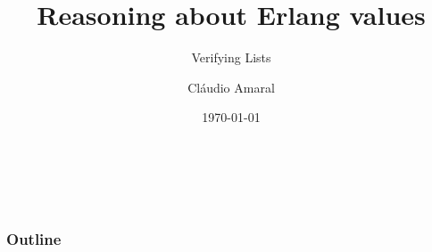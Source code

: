 \title{Reasoning about Erlang values}
\subtitle{Verifying Lists}
\author{Cl\'{a}udio Amaral}
\titlegraphic{}
\date{\today}
\begin{frame}[plain]
  \titlepage
  \begin{center} {
       \\ 
      
      \vspace{0.1cm}
    }
  \end{center}
\end{frame}
\section[Contents]{}
\begin{frame}
	\frametitle{Outline}
	\tableofcontents[%
	]
\end{frame}
